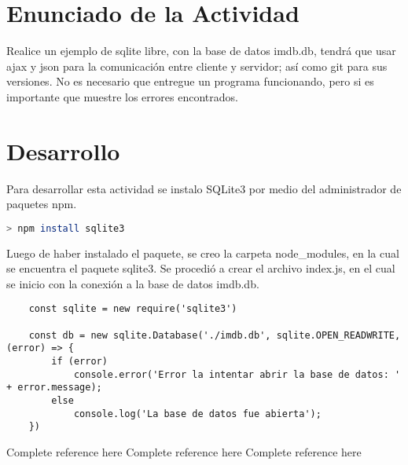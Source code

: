 \section{Enunciado de la Actividad}

Realice un ejemplo de sqlite libre, con la base de datos imdb.db, tendrá que usar ajax y json para la comunicación entre cliente y servidor; así como git para sus versiones. No es necesario que entregue un programa funcionando, pero si es importante que muestre los errores encontrados.

\section{Desarrollo}

Para desarrollar esta actividad se instalo SQLite3 por medio del administrador de paquetes npm. 
\begin{lstlisting}[language=bash]
    > npm install sqlite3
\end{lstlisting}

Luego de haber instalado el paquete, se creo la carpeta node\_modules, en la cual se encuentra el paquete sqlite3. Se procedió a crear el archivo index.js, en el cual se inicio con la conexión a la base de datos imdb.db.

\begin{lstlisting}
    const sqlite = new require('sqlite3')

    const db = new sqlite.Database('./imdb.db', sqlite.OPEN_READWRITE, (error) => {
        if (error)
            console.error('Error la intentar abrir la base de datos: ' + error.message);
        else 
            console.log('La base de datos fue abierta');
    })
\end{lstlisting}







\clearpage
\begin{thebibliography}{X}
     Complete reference here
     Complete reference here
     Complete reference here
\end{thebibliography}